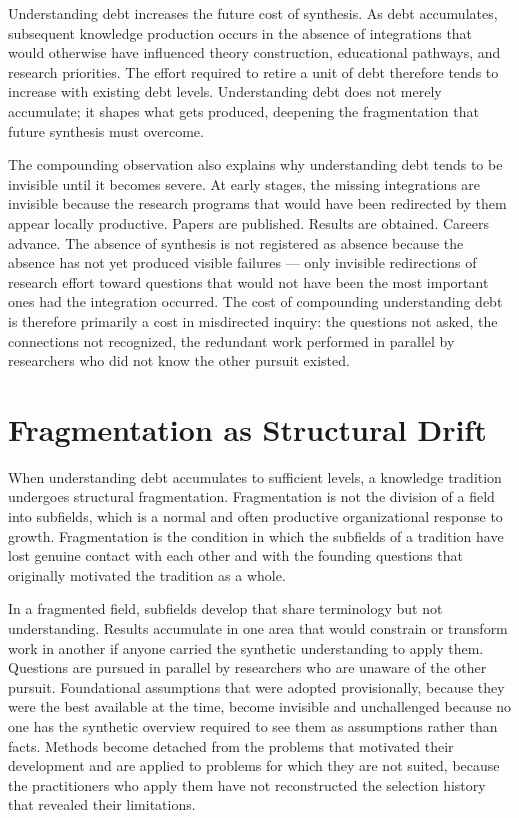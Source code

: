 \begin{observation}
Understanding debt increases the future cost of synthesis. As debt accumulates,
subsequent knowledge production occurs in the absence of integrations that
would otherwise have influenced theory construction, educational pathways,
and research priorities. The effort required to retire a unit of debt
therefore tends to increase with existing debt levels. Understanding debt
does not merely accumulate; it shapes what gets produced, deepening the
fragmentation that future synthesis must overcome.
\end{observation}

The compounding observation also explains why understanding debt tends to
be invisible until it becomes severe. At early stages, the missing integrations
are invisible because the research programs that would have been redirected
by them appear locally productive. Papers are published. Results are obtained.
Careers advance. The absence of synthesis is not registered as absence because
the absence has not yet produced visible failures --- only invisible redirections
of research effort toward questions that would not have been the most important
ones had the integration occurred. The cost of compounding understanding debt
is therefore primarily a cost in misdirected inquiry: the questions not asked,
the connections not recognized, the redundant work performed in parallel by
researchers who did not know the other pursuit existed.

\section{Fragmentation as Structural Drift}

When understanding debt accumulates to sufficient levels, a knowledge tradition
undergoes structural fragmentation. Fragmentation is not the division of a
field into subfields, which is a normal and often productive organizational
response to growth. Fragmentation is the condition in which the subfields of
a tradition have lost genuine contact with each other and with the founding
questions that originally motivated the tradition as a whole.

In a fragmented field, subfields develop that share terminology but not
understanding. Results accumulate in one area that would constrain or transform
work in another if anyone carried the synthetic understanding to apply them.
Questions are pursued in parallel by researchers who are unaware of the other
pursuit. Foundational assumptions that were adopted provisionally, because
they were the best available at the time, become invisible and unchallenged
because no one has the synthetic overview required to see them as assumptions
rather than facts. Methods become detached from the problems that motivated
their development and are applied to problems for which they are not suited,
because the practitioners who apply them have not reconstructed the selection
history that revealed their limitations.

